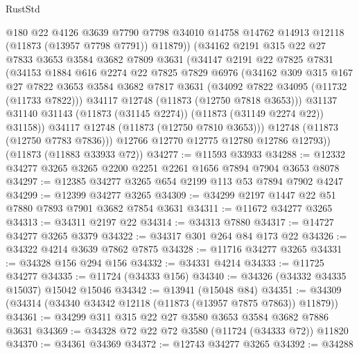 \begin{lexlean}{RustStd}
\begin{coremodule}
              @180
              @22
              @4126
              @3639
              @7790
              @7798
              @34010
              @14758
              @14762
              @14913
              @12118
              (@11873 (@13957 @7798 @7791))
              @11879))
          (@34162
            @2191
            @315
            @22
            @27
            @7833
            @3653
            @3584
            @3682
            @7809
            @3631
            (@34147
              @2191
              @22
              @7825
              @7831
              (@34153
                @1884
                @616
                @2274
                @22
                @7825
                @7829
                @6976
                (@34162
                  @309
                  @315
                  @167
                  @27
                  @7822
                  @3653
                  @3584
                  @3682
                  @7817
                  @3631
                  (@34092 @7822 @34095 (@11732 (@11733 @7822)))
                  @34117
                  @12748
                  (@11873 (@12750 @7818 @3653)))
                @31137
                @31140
                @31143
                (@11873 (@31145 @2274))
                (@11873 (@31149 @2274 @22))
                @31158))
            @34117
            @12748
            (@11873 (@12750 @7810 @3653)))
          @12748
          (@11873 (@12750 @7783 @7836)))
        @12766
        @12770
        @12775
        @12780
        @12786
        @12793))
    (@11873 (@11883 @33933 @72))
@34277 := @11593 @33933
@34288 := @12332 @34277 @3265 @3265 @2200 @2251 @2261 @1656 @7894 @7904 @3653 @8078
@34297 := @12385 @34277 @3265 @654 @2199 @113 @53 @7894 @7902 @4247
@34299 := @12399 @34277 @3265
@34309 := @34299 @2197 @1447 @22 @51 @7880 @7893 @7901 @3682 @7854 @3631
@34311 := @11672 @34277 @3265
@34313 := @34311 @2197 @22
@34314 := @34313 @7880
@34317 := @14727 @34277 @3265 @3379
@34322 := @34317 @301 @264 @84 @173 @22
@34326 := @34322 @4214 @3639 @7862 @7875
@34328 := @11716 @34277 @3265
@34331 := @34328 @156 @294 @156
@34332 := @34331 @4214
@34333 := @11725 @34277
@34335 := @11724 (@34333 @156)
@34340 := @34326 (@34332 @34335 @15037) @15042 @15046
@34342 := @13941 (@15048 @84)
@34351 := @34309 (@34314 (@34340 @34342 @12118 (@11873 (@13957 @7875 @7863)) @11879))
@34361 := @34299 @311 @315 @22 @27 @3580 @3653 @3584 @3682 @7886 @3631
@34369 := @34328 @72 @22 @72 @3580 (@11724 (@34333 @72)) @11820
@34370 := @34361 @34369
@34372 := @12743 @34277 @3265
@34392 := @34288

\end{coremodule}
\end{lexlean}
